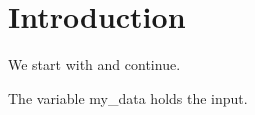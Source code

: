 \documentclass{article}
\begin{document}
\section{Introduction}
We start with \foobar{} and continue.

The variable my_data holds the input.


\end{document}
